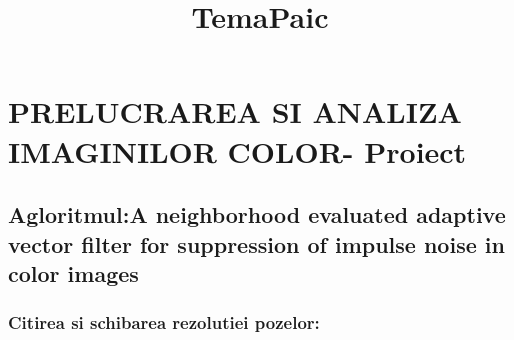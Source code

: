 \documentclass[11pt]{article}
\title{TemaPaic}
\begin{document}
    
    
    \maketitle
    
    

    
    \hypertarget{prelucrarea-si-analiza-imaginilor-color--proiect}{%
\section{PRELUCRAREA SI ANALIZA IMAGINILOR COLOR-
Proiect}\label{prelucrarea-si-analiza-imaginilor-color--proiect}}

\hypertarget{agloritmula-neighborhood-evaluated-adaptive-vector-filter-for-suppression-of-impulse-noise-in-color-images}{%
\subsection{Agloritmul:A neighborhood evaluated adaptive vector filter
for suppression of impulse noise in color
images}\label{agloritmula-neighborhood-evaluated-adaptive-vector-filter-for-suppression-of-impulse-noise-in-color-images}}

\hypertarget{citirea-si-schibarea-rezolutiei-pozelor}{%
\subsubsection{Citirea si schibarea rezolutiei
pozelor:}\label{citirea-si-schibarea-rezolutiei-pozelor}}
\end{document}
